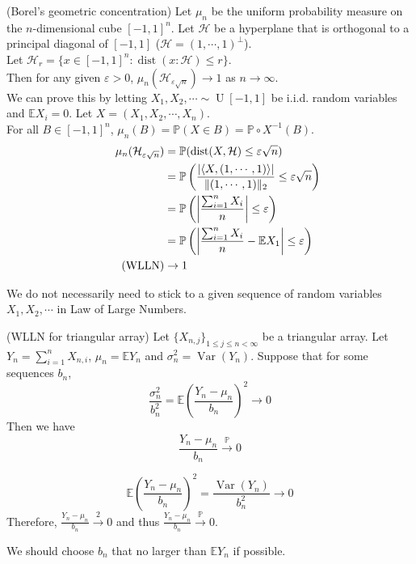 \documentclass{huhtakm-template-book}
\newcommand{\prob}{\mathbb{P}}
\newcommand{\expect}{\mathbb{E}}
\DeclareMathOperator{\U}{U}
\DeclareMathOperator{\Var}{Var}
\DeclareMathOperator{\dist}{dist}
\begin{document}
\newpage
\begin{eg}(Borel's geometric concentration)
	Let $\mu_{n}$ be the uniform probability measure on the $n$-dimensional cube $[-1,1]^{n}$. Let $\mathcal{H}$ be a hyperplane that is orthogonal to a principal diagonal of $[-1,1]$ ($\mathcal{H}=(1,\cdots,1)^{\perp}$).\\
	Let $\mathcal{H}_{r}=\{x\in[-1,1]^{n}:\dist(x:\mathcal{H})\leq r\}$.\\
	Then for any given $\varepsilon>0$, $\mu_{n}(\mathcal{H}_{\varepsilon\sqrt{n}})\to 1$ as $n\to\infty$.\\
	We can prove this by letting $X_{1},X_{2},\cdots\sim\U[-1,1]$ be i.i.d. random variables and $\expect X_{i}=0$. Let $X=(X_{1},X_{2},\cdots,X_{n})$.\\
	For all $B\in[-1,1]^{n}$, $\mu_{n}(B)=\prob(X\in B)=\prob\circ X^{-1}(B)$.
	\begin{align*}
		\mu_{n}(\mathcal{H}_{\varepsilon\sqrt{n}})&=\prob(\dist(X,\mathcal{H})\leq\varepsilon\sqrt{n})\\
		&=\prob\left(\frac{\abs{\left<X,(1,\cdots,1)\right>}}{\norm{(1,\cdots,1)}_{2}}\leq\varepsilon\sqrt{n}\right)\\
		&=\prob\left(\abs{\frac{\sum_{i=1}^{n}X_{i}}{n}}\leq\varepsilon\right)\\
		&=\prob\left(\abs{\frac{\sum_{i=1}^{n}X_{i}}{n}-\expect X_{1}}\leq\varepsilon\right)\\
		\tag{WLLN}
		&\to 1
	\end{align*}
\end{eg}
We do not necessarily need to stick to a given sequence of random variables $X_{1},X_{2},\cdots$ in Law of Large Numbers.
\begin{thm}(WLLN for triangular array)
	Let $\{X_{n,j}\}_{1\leq j\leq n<\infty}$ be a triangular array. Let $Y_{n}=\sum_{i=1}^{n}X_{n,i}$, $\mu_{n}=\expect Y_{n}$ and $\sigma_{n}^{2}=\Var(Y_{n})$. Suppose that for some sequences $b_{n}$,
	\begin{equation*}
		\frac{\sigma_{n}^{2}}{b_{n}^{2}}=\expect\left(\frac{Y_{n}-\mu_{n}}{b_{n}}\right)^{2}\to 0
	\end{equation*}
	Then we have
	\begin{equation*}
		\frac{Y_{n}-\mu_{n}}{b_{n}}\xrightarrow{\prob}0
	\end{equation*}
\end{thm}
\begin{proofing}
	\begin{equation*}
		\expect\left(\frac{Y_{n}-\mu_{n}}{b_{n}}\right)^{2}=\frac{\Var(Y_{n})}{b_{n}^{2}}\to 0
	\end{equation*}
	Therefore, $\frac{Y_{n}-\mu_{n}}{b_{n}}\xrightarrow{2}0$ and thus $\frac{Y_{n}-\mu_{n}}{b_{n}}\xrightarrow{\prob}0$.
\end{proofing}
\begin{rem}
	We should choose $b_{n}$ that no larger than $\expect Y_{n}$ if possible.
\end{rem}
\end{document}

